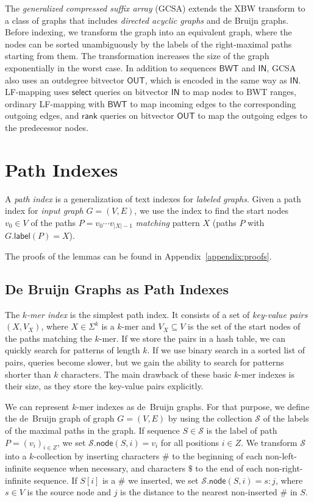 \documentclass[twoside,leqno,twocolumn]{article}
\newcommand{\abs}[1]{\ensuremath{\lvert #1 \rvert}}
\newcommand{\rank}{\ensuremath{\mathsf{rank}}}
\newcommand{\select}{\ensuremath{\mathsf{select}}}
\newcommand{\glabel}{\ensuremath{\mathsf{label}}}
\newcommand{\gnode}{\ensuremath{\mathsf{node}}}
\newcommand{\kmer}[1]{$#1$\nobreakdash-mer}
\newcommand{\kcollection}[1]{$#1$\nobreakdash-collection}
\newcommand{\LFmapping}{LF\nobreakdash-mapping}
\newcommand{\BWT}{\ensuremath{\mathsf{BWT}}}
\newcommand{\bvIN}{\ensuremath{\mathsf{IN}}}
\newcommand{\bvOUT}{\ensuremath{\mathsf{OUT}}}
\begin{document}
The \emph{generalized compressed suffix array} (GCSA) \cite{Siren2014} extends the XBW transform to a class of graphs that includes \emph{directed acyclic graphs} and de Bruijn graphs. Before indexing, we transform the graph into an equivalent graph, where the nodes can be sorted unambiguously by the labels of the right-maximal paths starting from them. The transformation increases the size of the graph exponentially in the worst case. In addition to sequences $\BWT$ and $\bvIN$, GCSA also uses an outdegree bitvector $\bvOUT$, which is encoded in the same way as $\bvIN$. \LFmapping{} uses $\select$ queries on bitvector $\bvIN$ to map nodes to BWT ranges, ordinary \LFmapping{} with $\BWT$ to map incoming edges to the corresponding outgoing edges, and $\rank$ queries on bitvector $\bvOUT$ to map the outgoing edges to the predecessor nodes.


\section{Path Indexes}\label{sect:path-indexes}

A \emph{path index} is a generalization of text indexes for \emph{labeled graphs}. Given a path index for \emph{input graph} $G = (V, E)$, we use the index to find the start nodes $v_{0} \in V$ of the paths $P = v_{0} \dotsm v_{\abs{X}-1}$ \emph{matching} pattern $X$ (paths $P$ with $G.\glabel(P) = X$).

The proofs of the lemmas can be found in Appendix~\ref{appendix:proofs}.

\subsection{De Bruijn Graphs as Path Indexes}

The \emph{\kmer{k} index} is the simplest path index. It consists of a set of \emph{key-value pairs} $(X, V_{X})$, where $X \in \Sigma^{k}$ is a \kmer{k} and $V_{X} \subseteq V$ is the set of the start nodes of the paths matching the \kmer{k}. If we store the pairs in a hash table, we can quickly search for patterns of length $k$. If we use binary search in a sorted list of pairs, queries become slower, but we gain the ability to search for patterns shorter than $k$ characters. The main drawback of these basic \kmer{k} indexes is their size, as they store the key-value pairs explicitly.

We can represent \kmer{k} indexes as de~Bruijn graphs. For that purpose, we define the de~Bruijn graph of graph $G = (V, E)$ by using the collection $\mathcal{S}$ of the labels of the maximal paths in the graph. If sequence $S \in \mathcal{S}$ is the label of path $P = (v_{i})_{i \in Z}$, we set $\mathcal{S}.\gnode(S, i) = v_{i}$ for all positions $i \in Z$. We transform $\mathcal{S}$ into a \kcollection{k} by inserting characters $\#$ to the beginning of each non-left-infinite sequence when necessary, and characters $\$$ to the end of each non-right-infinite sequence. If $S[i]$ is a $\#$ we inserted, we set $\mathcal{S}.\gnode(S, i) = s:j$, where $s \in V$ is the source node and $j$ is the distance to the nearest non-inserted $\#$ in $S$.
\end{document}
